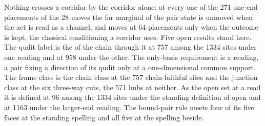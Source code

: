 Nothing crosses a corridor by the corridor alone: at every one of the 271 one-end placements of the 28 moves the far marginal of the pair state is unmoved when the act is read as a channel, and moves at 64 placements only when the outcome is kept, the classical conditioning a corridor uses.
Five open results stand here. The qudit label is the  of the chain through it at 757 among the 1334 sites under one reading and at 958 under the other. The only-basis requirement is a reading, a pair fixing a direction of its qudit only at a one-dimensional common support. The frame class is the chain class at the 757 chain-faithful sites and the junction class at the six three-way cuts, the 571 hubs at neither. As the open set at a read it is defined at 96 among the 1334 sites under the standing definition of open and at 1163 under the larger-end reading. The bound-pair rule meets four of its five faces at the standing spelling and all five at the spelling beside.
